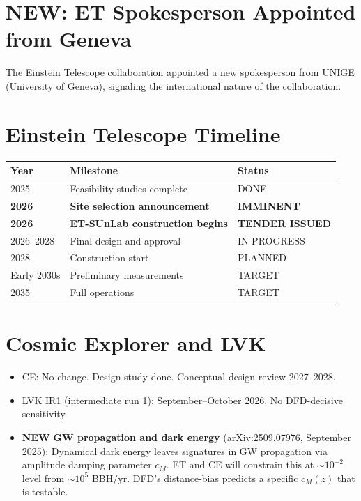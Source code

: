 \documentclass[11pt,a4paper]{article}
\newcommand{\NEW}{\textcolor{dfdblue}{\textbf{NEW}}}
\begin{document}
\section{\NEW: ET Spokesperson Appointed from Geneva}

The Einstein Telescope collaboration appointed a new spokesperson from UNIGE (University of Geneva), signaling the international nature of the collaboration.

\section{Einstein Telescope Timeline}

\begin{center}
\begin{tabular}{lll}
\toprule
\textbf{Year} & \textbf{Milestone} & \textbf{Status} \\
\midrule
2025 & Feasibility studies complete & DONE \\
\textbf{2026} & \textbf{Site selection announcement} & \textbf{IMMINENT} \\
\textbf{2026} & \textbf{ET-SUnLab construction begins} & \textbf{TENDER ISSUED} \\
2026--2028 & Final design and approval & IN PROGRESS \\
2028 & Construction start & PLANNED \\
Early 2030s & Preliminary measurements & TARGET \\
2035 & Full operations & TARGET \\
\bottomrule
\end{tabular}
\end{center}

\section{Cosmic Explorer and LVK}

\begin{itemize}
\item CE: No change. Design study done. Conceptual design review 2027--2028.
\item LVK IR1 (intermediate run 1): September--October 2026. No DFD-decisive sensitivity.
\item \NEW{} \textbf{GW propagation and dark energy} (arXiv:2509.07976, September 2025): Dynamical dark energy leaves signatures in GW propagation via amplitude damping parameter $c_M$. ET and CE will constrain this at $\sim 10^{-2}$ level from $\sim 10^5$ BBH/yr. DFD's distance-bias predicts a specific $c_M(z)$ that is testable.
\end{itemize}
\end{document}
